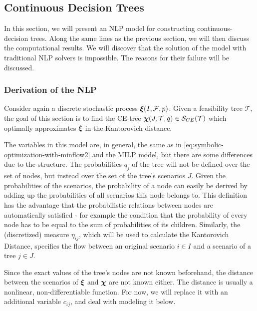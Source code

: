 \subsection{Continuous Decision Trees}
\label{sec:naive-cont-decis-trees}
In this  section, we will present an NLP model for constructing continuous-decision trees.
Along the same lines as the previous section, we will then discuss the computational results.
We will discover that the solution of the model with traditional NLP solvers is impossible.
The reasons for their failure will be discussed.
\subsubsection{Derivation of the NLP}
Consider again a discrete stochastic process $\boldsymbol\xi(I,\mathcal{F},p)$.
Given a feasibility tree $\mathcal{T}$, the goal of this section is to find the CE-tree $\boldsymbol\chi(J,\mathcal{T}, q)\in\mathcal{S}_{CE}(\mathcal{T})$ which optimally approximates $\boldsymbol\xi$ in the Kantorovich distance.

The variables in this model are, in general, the same as in \eqref{eq:symbolic-optimization-with-minflow2} and the MILP model, but there are some differences due to the structure.
The probabilities $q_j$ of the tree will not be defined over the set of nodes, but instead over the set of the tree's scenarios $J$.
Given the probabilities of the scenarios, the probability of a node can easily be derived by adding up the probabilities of all scenarios this node belongs to.
This definition has the advantage that the probabilistic relations between nodes are automatically satisfied - for example the condition that the probability of every node has to be equal to the sum of probabilities of its children.
Similarly, the (discretized) measure $\eta_{ij}$, which will be used to calculate the Kantorovich Distance, specifies the flow between an original scenario $i \in I$ and a scenario of a tree $j \in J$.

Since the exact values of the tree's nodes are not known beforehand, the distance between the scenarios of $\boldsymbol\xi$ and $\boldsymbol\chi$ are not known either.
The distance is usually a nonlinear, non-differentiable function.
For now, we will replace it with an additional variable $c_{ij}$, and deal with modeling it below.

